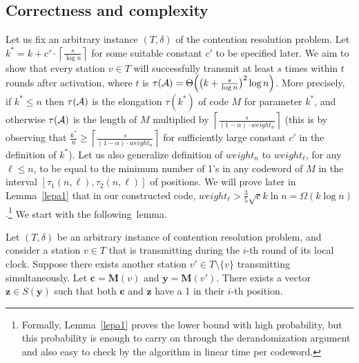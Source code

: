 \documentclass[11pt]{article}
\begin{document}
\subsection{Correctness and complexity}

Let us fix an arbitrary instance $(T, \delta)$ of the contention resolution problem.
{Let 
$k^*=k+c'\cdot \left\lceil\frac{s}{\log n}\right\rceil$
for some suitable constant $c'$ to be specified later.}
We aim to show that every station $v \in T$ will successfully transmit {at least $s$ times} within $t$ rounds after activation, 
where $t$ is {
$\tau({\cal A})=\Theta\Big(\big(k+\frac{s}{\log n}\big)^2\log n\Big)$. More precisely, if $k^*\le n$ then $\tau({\cal A})$ is the elongation $\tau(k^*)$ of code $M$ for parameter $k^*$, and otherwise $\tau({\cal A})$ is the length of $M$ multiplied by $\left\lceil\frac{s}{(1-\alpha)\cdot weight_n}\right\rceil
$ (this is by observing that $\frac{k^*}{n}\ge \left\lceil\frac{s}{(1-\alpha)\cdot weight_n}\right\rceil$ for sufficiently large constant $c'$ in the definition of $k^*$). Let us also generalize definition of $weight_n$ to $weight_{\ell}$, for any $\ell\le n$, to be equal to the minimum number of 1's in any codeword of $M$ in the interval $[\tau_1(n,\ell),\tau_2(n,\ell)]$ of positions. We will prove later in Lemma~\ref{lepa1} that in our constructed code, $weight_{\ell}>\frac{3}{5}\sqrt{c}k\ln n = \Omega(k\log n)$.\footnote{{Formally, Lemma~\ref{lepa1} proves the lower bound with high probability, but this probability is enough to carry on through the derandomization argument and also easy to check by the algorithm in linear time per codeword.}}}
We start with the following~lemma.


\begin{lemma}\label{l:collision}
	Let $(T, \delta)$ be an arbitrary instance of contention resolution problem, and consider a station $v \in T$ that is transmitting during the $i$-th round of its local clock.
	Suppose there exists another station $v' \in T\setminus \{v\}$ transmitting simultaneously.
	Let $\mathbf{c} = \mathbf{M}(v)$ and $\mathbf{y} = \mathbf{M}(v')$. There exists a vector $\mathbf{z} \in S(\mathbf{y})$ such that both $\mathbf{c}$ and $\mathbf{z}$ have a 1 in their $i$-th position.
\end{lemma}
\end{document}
